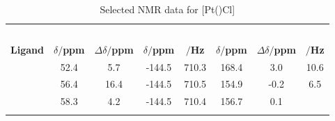 \begin{table}
\caption[Selected NMR data for [Pd(\tBuxantphos)Cl{]} complexes]{Selected NMR data for [Pt(\tBuxantphos)Cl]}
\label{table:PdPF6NMR}
\small
\begin{center}
\begin{tabular}{l c c c c c c c}
	\toprule{}
	~~ & \multicolumn{4}{c}{\bfseries{\phosphorus}} & \multicolumn{3}{c}{\bfseries{\carbon}}\\
	\cmidrule(lr){2-5} \cmidrule(lr){6-8}
	\bfseries{Ligand}&\bfseries{$\delta/$ppm}&\bfseries{$\Delta\delta/$ppm}& \bfseries{$\delta/$ppm} & \bfseries{\JPF$/$Hz} & \bfseries{$\delta/$ppm}&\bfseries{$\Delta\delta/$ppm}&\bfseries{\J{}$/$Hz}\\
	\midrule{}
	\tBuSixantphos		& 52.4	& 5.7		& -144.5	& 710.3	& 168.4	& 3.0		& 10.6 \\
	\tBuThixantphos 	& 56.4	& 16.4	& -144.5	& 710.5	& 154.9	& -0.2	& 6.5\\
	\tBuXantphos		& 58.3	& 4.2		& -144.5	& 710.4	& 156.7	& 0.1 	& \fixme{XXX}\\
	\bottomrule{}
\end{tabular}
\end{center}
\end{table}




